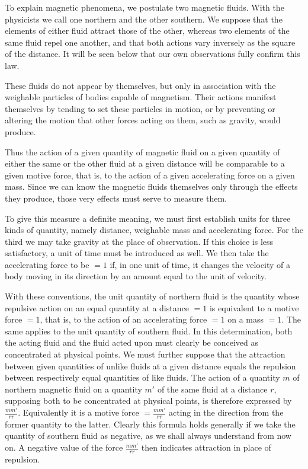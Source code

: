 To explain magnetic phenomena, we postulate two magnetic fluids. With the physicists we call one northern and the other southern. We suppose that the elements of either fluid attract those of the other, whereas two elements of the same fluid repel one another, and that both actions vary inversely as the square of the distance. It will be seen below that our own observations fully confirm this law.

These fluids do not appear by themselves, but only in association with the weighable particles of bodies capable of magnetism. Their actions manifest themselves by tending to set these particles in motion, or by preventing or altering the motion that other forces acting on them, such as gravity, would produce.

Thus the action of a given quantity of magnetic fluid on a given quantity of either the same or the other fluid at a given distance will be comparable to a given motive force, that is, to the action of a given accelerating force on a given mass. Since we can know the magnetic fluids themselves only through the effects they produce, those very effects must serve to measure them.

To give this measure a definite meaning, we must first establish units for three kinds of quantity, namely distance, weighable mass and accelerating force. For the third we may take gravity at the place of observation. If this choice is less satisfactory, a unit of time must be introduced as well. We then take the accelerating force to be $=1$ if, in one unit of time, it changes the velocity of a body moving in its direction by an amount equal to the unit of velocity.

With these conventions, the unit quantity of northern fluid is the quantity whose repulsive action on an equal quantity at a distance $=1$ is equivalent to a motive force $=1$, that is, to the action of an accelerating force $=1$ on a mass $=1$. The same applies to the unit quantity of southern fluid. In this determination, both the acting fluid and the fluid acted upon must clearly be conceived as concentrated at physical points. We must further suppose that the attraction between given quantities of unlike fluids at a given distance equals the repulsion between respectively equal quantities of like fluids. The action of a quantity $m$ of northern magnetic fluid on a quantity $m'$ of the same fluid at a distance $r$, supposing both to be concentrated at physical points, is therefore expressed by $\frac{mm'}{rr}$. Equivalently it is a motive force $=\frac{mm'}{rr}$ acting in the direction from the former quantity to the latter. Clearly this formula holds generally if we take the quantity of southern fluid as negative, as we shall always understand from now on. A negative value of the force $\frac{mm'}{rr}$ then indicates attraction in place of repulsion.

